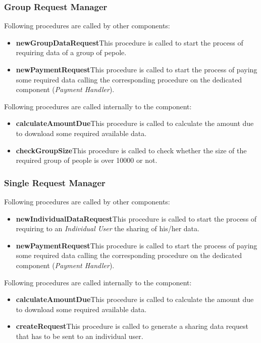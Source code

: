 \subsubsection{Group Request Manager}
Following procedures are called by other components:
\begin{itemize}
  \item \textbf{newGroupDataRequest}\quad This procedure is called to start the process of requiring data of a group of pepole.
  \item \textbf{newPaymentRequest}\quad This procedure is called to start the process of paying some required data calling the corresponding procedure on the dedicated component (\textit{Payment Handler}).
\end{itemize}

\myparagraph{}
Following procedures are called internally to the component:
\begin{itemize}
  \item \textbf{calculateAmountDue}\quad This procedure is called to calculate the amount due to download some required available data.
  \item \textbf{checkGroupSize}\quad This procedure is called to check whether the size of the required group of people is over 10000 or not.
\end{itemize}

\subsubsection{Single Request Manager}
Following procedures are called by other components:
\begin{itemize}
  \item \textbf{newIndividualDataRequest}\quad This procedure is called to start the process of requiring to an \textit{Individual User} the sharing of his/her data.
  \item \textbf{newPaymentRequest}\quad This procedure is called to start the process of paying some required data calling the corresponding procedure on the dedicated component (\textit{Payment Handler}).
\end{itemize}

\myparagraph{}
Following procedures are called internally to the component:
\begin{itemize}
  \item \textbf{calculateAmountDue}\quad This procedure is called to calculate the amount due to download some required available data.
  \item \textbf{createRequest}\quad This procedure is called to generate a sharing data request that has to be sent to an individual user.
\end{itemize}

